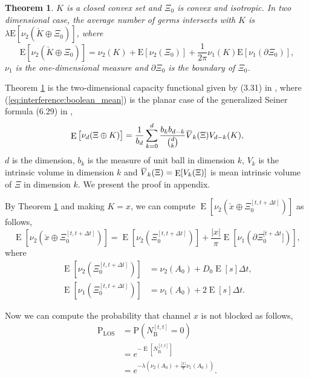 \documentclass[10pt, conference, letterpaper]{IEEEtran}
\newtheorem{theorem}{Theorem}
\DeclareMathOperator*{\E}{\mathrm{E}}
\newcommand{\overbar}[1]{\mkern 1.5mu\overline{\mkern-1.5mu#1\mkern-1.5mu}\mkern 1.5mu}
\begin{document}
\begin{theorem}\label{theorem:boolean_mean}
$K$ is a closed convex set and $\Xi_0$ is convex and isotropic. In two dimensional case, the average number of germs intersects  with $K$ is $\lambda\mathrm{E}[\nu_2(\check{K}\oplus \Xi_0)]$, where 
\begin{equation}\label{eq:interference:boolean_mean}
\mathrm{E}[\nu_2(\check{K}\oplus \Xi_0)] = \nu_2(K) + \mathrm{E}[\nu_2(\Xi_0)] + \frac{1}{2\pi}\nu_1(K)\mathrm{E}[\nu_1(\partial \Xi_0)],
\end{equation}
$\nu_1$ is the one-dimensional measure and $\partial \Xi_0$ is the boundary of $\Xi_0$.
\end{theorem}
Theorem \ref{theorem:boolean_mean} is the two-dimensional capacity functional given by (3.31) in \cite{stochasticapp}, where (\ref{eq:interference:boolean_mean}) is the planar case of the generalized Seiner formula (6.29) in \cite{stochasticapp},  
\begin{equation*}
\E\big[\nu_d(\Xi\oplus K)\big] = \frac{1}{b_d}\sum\limits_{k=0}^{d}\frac{b_k b_{d-k}}{{d \choose k}}\overbar{V}_k(\Xi) V_{d-k}(K),
\end{equation*}
$d$ is the dimension, $b_k$ is the measure of unit ball in dimension $k$, $V_k$ is the intrinsic volume in dimension $k$ and $\overbar{V}_k(\Xi) = \E[V_k(\Xi)]$ is mean intrinsic volume of $\Xi$ in dimension $k$. We present the proof in appendix.

By Theorem \ref{theorem:boolean_mean} and making $K = x$, we can compute $\E[\nu_2(\check{x}\oplus\Xi_0^{[t, t+\Delta t]})]$ as follows,
\begin{equation}\label{eq:boolean_mean}
\E[\nu_2(\check{x}\oplus\Xi_0^{[t, t+\Delta t]})] = \E[\nu_2(\Xi_0^{[t, t+\Delta t]})] + \frac{|x|}{\pi}\E[\nu_1(\partial \Xi_0^{[t + \Delta t}])],
\end{equation}
where
\begin{equation*}
\begin{split}
\E[\nu_2(\Xi_0^{[t, t+\Delta t]})] & = \nu_2(A_0) + D_0\E[s]\Delta t,\\
\E[\nu_1(\Xi_0^{[t, t+\Delta t]})] & = \nu_1(A_0) + 2\E[s]\Delta t.
\end{split}
\end{equation*}

Now we can compute the probability that channel $x$ is not blocked as follows, 
\begin{equation}\label{eq:P_LOS}
\begin{aligned}
\mathrm{P}_{\mathrm{LOS}} & = \mathrm{P}(N_{\mathrm{B}}^{[t, t]}=0)  \\
& = e^{-\E[N_\mathrm{B}^{[t,t]}]} \\
& = e^{-\lambda(\nu_2(A_0) + \frac{|x|}{\pi}\nu_1(A_0))}. 
\end{aligned}
\end{equation}
\end{document}
